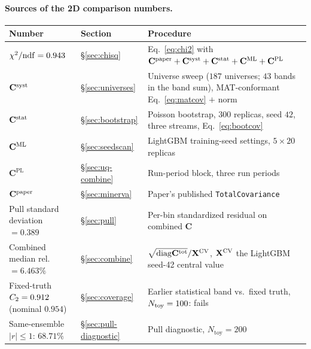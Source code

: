 \paragraph{Sources of the 2D comparison numbers.}
\begin{center}
\begin{tabularx}{\textwidth}{@{}>{\RaggedRight\arraybackslash}p{}l>{\RaggedRight\arraybackslash}X@{}}
\toprule
Number & Section & Procedure \\
\midrule
$\chi^{2}/\mathrm{ndf} = 0.943$ & \S\ref{sec:chisq} &
  Eq.~\eqref{eq:chi2} with $\mathbf{C}^{\text{paper}}+\mathbf{C}^{\text{syst}}+\mathbf{C}^{\text{stat}}+\mathbf{C}^{\text{ML}}+\mathbf{C}^{\mathrm{PL}}$ \\
$\mathbf{C}^{\text{syst}}$ & \S\ref{sec:universes} &
  Universe sweep ($187$ universes; $43$ bands in the band sum), MAT-conformant Eq.~\eqref{eq:matcov} $+$ norm \\
$\mathbf{C}^{\text{stat}}$ & \S\ref{sec:bootstrap} &
  Poisson bootstrap, $300$ replicas, seed $42$, three streams, Eq.~\eqref{eq:bootcov} \\
$\mathbf{C}^{\text{ML}}$ & \S\ref{sec:seedscan} & LightGBM training-seed settings, $5\times20$ replicas \\
$\mathbf{C}^{\mathrm{PL}}$ & \S\ref{sec:uq-combine} & Run-period block, three run periods \\
$\mathbf{C}^{\text{paper}}$ & \S\ref{sec:minerva} & Paper's published \texttt{TotalCovariance} \\
Pull standard deviation $= 0.389$ & \S\ref{sec:pull} & %
  Per-bin standardized residual on combined $\mathbf{C}$ \\
Combined median rel.\ $= 6.463\%$ & \S\ref{sec:combine} & %
  $\sqrt{\mathrm{diag}\mathbf{C}^{\text{tot}}}/\mathbf{X}^{\text{CV}}$, $\mathbf{X}^{\text{CV}}$ the LightGBM seed-42 central value \\
Fixed-truth $C_2=0.912$ (nominal $0.954$) & \S\ref{sec:coverage} &
  Earlier statistical band vs.\ fixed truth, $N_{\text{toy}}=100$: fails \\
Same-ensemble $|r|\leq1$: $68.71\%$ & \S\ref{sec:pull-diagnostic} &
  Pull diagnostic, $N_{\text{toy}}=200$ \\
\bottomrule
\end{tabularx}
\end{center}

